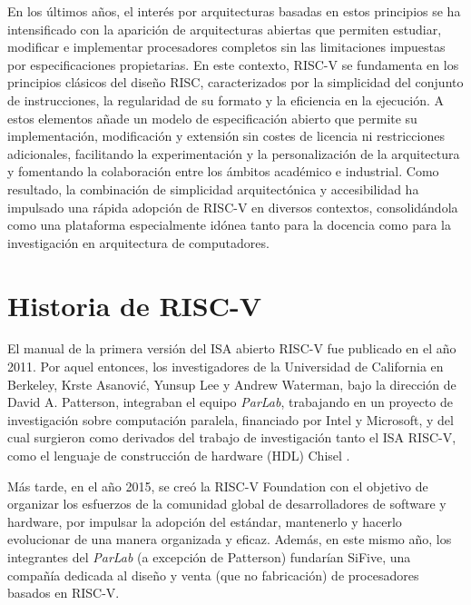 En los últimos años, el interés por arquitecturas basadas en estos principios se ha intensificado con la aparición de arquitecturas abiertas que permiten estudiar, modificar e implementar procesadores completos sin las limitaciones impuestas por especificaciones propietarias. En este contexto, RISC-V se fundamenta en los principios clásicos del diseño RISC, caracterizados por la simplicidad del conjunto de instrucciones, la regularidad de su formato y la eficiencia en la ejecución. A estos elementos añade un modelo de especificación abierto que permite su implementación, modificación y extensión sin costes de licencia ni restricciones adicionales, facilitando la experimentación y la personalización de la arquitectura y fomentando la colaboración entre los ámbitos académico e industrial. Como resultado, la combinación de simplicidad arquitectónica y accesibilidad ha impulsado una rápida adopción de RISC-V en diversos contextos, consolidándola como una plataforma especialmente idónea tanto para la docencia como para la investigación en arquitectura de computadores.

\section{Historia de RISC-V}

El manual de la primera versión del ISA abierto RISC-V fue publicado en el año 2011. Por aquel entonces, los investigadores de la Universidad de California en Berkeley, Krste Asanović, Yunsup Lee y Andrew Waterman, bajo la dirección de David A. Patterson, integraban el equipo \textit{ParLab}, trabajando en un proyecto de investigación sobre computación paralela, financiado por Intel y Microsoft, y del cual surgieron como derivados del trabajo de investigación tanto el ISA RISC-V, como el lenguaje de construcción de hardware (HDL) Chisel \cite{riscvhistory}.

Más tarde, en el año 2015, se creó la RISC-V Foundation con el objetivo de organizar los esfuerzos de la comunidad global de desarrolladores de software y hardware, por impulsar la adopción del estándar, mantenerlo y hacerlo evolucionar de una manera organizada y eficaz. Además, en este mismo año, los integrantes del \textit{ParLab} (a excepción de Patterson) fundarían SiFive, una compañía dedicada al diseño y venta (que no fabricación) de procesadores basados en RISC-V.


